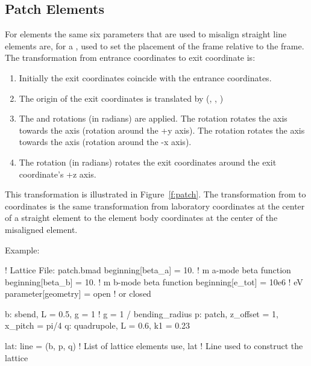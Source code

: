 \documentclass{hitec}
\begin{document}
\subsection{Patch Elements}
\label{s:patch}

For  elements the same six parameters that are used to misalign straight line elements
are, for a , used to set the placement of the  frame relative to the 
frame. The transformation from entrance coordinates to exit coordinate is:
\begin{enumerate}
\item Initially the exit coordinates coincide with the entrance coordinates.
\item The origin of the exit coordinates is translated by (, , )
\item The  and  rotations (in radians) are applied. 
The  rotation rotates the  axis
towards the  axis (rotation around the +y axis). The  rotation rotates the  axis
towards the  axis (rotation around the -x axis).
\item The  rotation (in radians) rotates the exit coordinates around the exit coordinate's +z
axis.
\end{enumerate}
This transformation is illustrated in Figure~\ref{f:patch}. The transformation from 
 to  coordinates is the same transformation from laboratory coordinates at the
center of a straight element to the element body coordinates at the center of the misaligned
element.

Example:
\begin{code}
! Lattice File: patch.bmad
beginning[beta_a] = 10.   ! m  a-mode beta function
beginning[beta_b] = 10.   ! m  b-mode beta function
beginning[e_tot] = 10e6   ! eV
parameter[geometry] = open  ! or closed

b: sbend, L = 0.5, g = 1    ! g = 1 / bending_radius
p: patch, z_offset = 1, x_pitch = pi/4
q: quadrupole, L = 0.6, k1 = 0.23

lat: line = (b, p, q)   ! List of lattice elements
use, lat                ! Line used to construct the lattice
\end{code}
\end{document}
